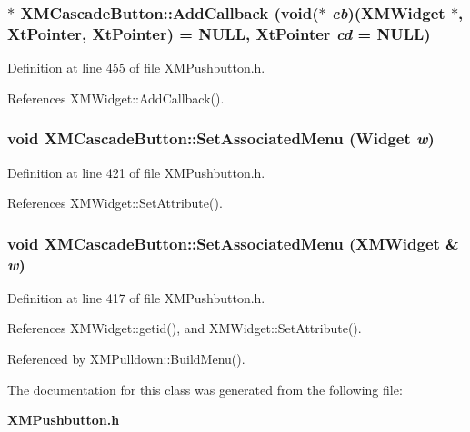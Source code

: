 \subsubsection{$\ast$ XMCascade\-Button::Add\-Callback (void($\ast$ {\em cb})({\bf XMWidget} $\ast$, Xt\-Pointer, Xt\-Pointer) = NULL, Xt\-Pointer {\em cd} = NULL)\hspace{0.3cm}{\tt  [inline]}}\label{classXMCascadeButton_a5}




Definition at line 455 of file XMPushbutton.h.

References XMWidget::Add\-Callback().
\subsubsection{\setlength{\rightskip}{0pt plus 5cm}void XMCascade\-Button::Set\-Associated\-Menu (Widget {\em w})\hspace{0.3cm}{\tt  [inline]}}\label{classXMCascadeButton_a1}




Definition at line 421 of file XMPushbutton.h.

References XMWidget::Set\-Attribute().
\subsubsection{\setlength{\rightskip}{0pt plus 5cm}void XMCascade\-Button::Set\-Associated\-Menu ({\bf XMWidget} \& {\em w})\hspace{0.3cm}{\tt  [inline]}}\label{classXMCascadeButton_a0}




Definition at line 417 of file XMPushbutton.h.

References XMWidget::getid(), and XMWidget::Set\-Attribute().

Referenced by XMPulldown::Build\-Menu().

The documentation for this class was generated from the following file:\begin{CompactItemize}
\item 
{\bf XMPushbutton.h}\end{CompactItemize}
